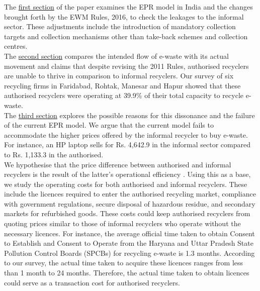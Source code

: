 \documentclass[a4paper, 12pt]{article}
\begin{document}
                    The \hyperref[sec:1]{first section} of the paper examines the EPR model in India and the changes brought forth by the EWM Rules, 2016, to check the leakages to the informal sector. These adjustments include the introduction of mandatory collection targets and collection mechanisms other than take-back schemes and collection centres. \\
                    
                   The \hyperref[sec:2]{second section} compares the intended flow of e-waste with its actual movement and claims that despite revising the 2011 Rules, authorised recyclers are unable to thrive in comparison to informal recyclers. Our survey of six recycling firms in Faridabad, Rohtak, Manesar and Hapur showed that these authorised recyclers were operating at 39.9\% of their total capacity to recycle e-waste. \\
                   
                   The \hyperref[sec:3]{third section} explores the possible reasons for this dissonance and the failure of the current EPR model. We argue that the current model fails to accommodate the higher prices offered by the informal recycler to buy e-waste. For instance, an HP laptop sells for Rs. 4,642.9 in the informal sector compared to Rs. 1,133.3 in the authorised.\\
                   
                   We hypothesise that the price difference between authorised and informal recyclers is the result of the latter’s operational efficiency \parencite{chintanreport}. Using this as a base, we study the operating costs for both authorised and informal recyclers. These include the licences required to enter the authorised recycling market, compliance with government regulations, secure disposal of hazardous residue, and secondary markets for refurbished goods. These costs could keep authorised recyclers from quoting prices similar to those of informal recyclers who operate without the necessary licences. For instance, the average official time taken to obtain Consent to Establish and Consent to Operate from the Haryana and Uttar Pradesh State Pollution Control Boards (SPCBs) for recycling e-waste is 1.3 months. According to our survey, the actual time taken to acquire these licences ranges from less than 1 month to 24 months. Therefore, the actual time taken to obtain licences could serve as a transaction cost for authorised recyclers.\\
                    
\end{document}

